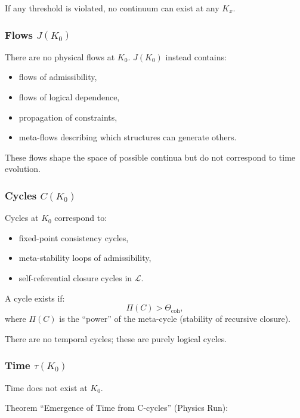 If any threshold is violated, no continuum can exist at any $K_x$.

\subsubsection{Flows \texorpdfstring{$J(K_0)$}{J(K_0)}}

There are no physical flows at $K_0$.  
$J(K_0)$ instead contains:
\begin{itemize}
    \item flows of admissibility,
    \item flows of logical dependence,
    \item propagation of constraints,
    \item meta-flows describing which structures can generate others.
\end{itemize}

These flows shape the space of possible continua but do not correspond
to time evolution.

\subsubsection{Cycles \texorpdfstring{$C(K_0)$}{C(K_0)}}

Cycles at $K_0$ correspond to:
\begin{itemize}
    \item fixed-point consistency cycles,
    \item meta-stability loops of admissibility,
    \item self-referential closure cycles in $\mathcal{L}$.
\end{itemize}

A cycle exists if:
\[
\Pi(C) > \Theta_{\mathrm{coh}},
\]
where $\Pi(C)$ is the ``power'' of the meta-cycle (stability of recursive
closure).

There are no temporal cycles; these are purely logical cycles.

\subsubsection{Time \texorpdfstring{$\tau(K_0)$}{\tau(K_0)}}

Time does not exist at $K_0$.

Theorem “Emergence of Time from C-cycles” (Physics Run):

